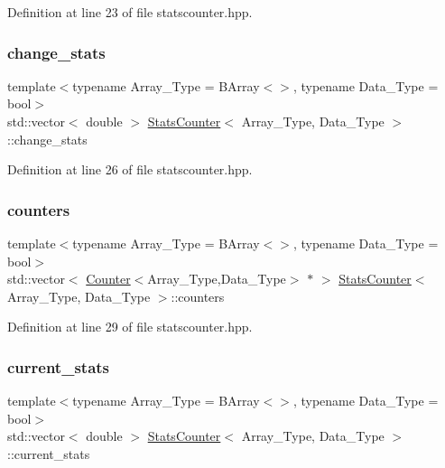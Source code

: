 Definition at line 23 of file statscounter.\+hpp.

\mbox{\label{class_stats_counter_a42c926799d8cb0abc6f5a1cfbc073f69}} 
\subsubsection{\texorpdfstring{change\+\_\+stats}{change\_stats}}
{\footnotesize\ttfamily template$<$typename Array\+\_\+\+Type  = B\+Array$<$$>$, typename Data\+\_\+\+Type  = bool$>$ \\
std\+::vector$<$ double $>$ \hyperlink{class_stats_counter}{Stats\+Counter}$<$ Array\+\_\+\+Type, Data\+\_\+\+Type $>$\+::change\+\_\+stats}



Definition at line 26 of file statscounter.\+hpp.

\mbox{\label{class_stats_counter_ab81464f54ee44deedf3fb1f16f9b87c5}} 
\subsubsection{\texorpdfstring{counters}{counters}}
{\footnotesize\ttfamily template$<$typename Array\+\_\+\+Type  = B\+Array$<$$>$, typename Data\+\_\+\+Type  = bool$>$ \\
std\+::vector$<$ \hyperlink{class_counter}{Counter}$<$Array\+\_\+\+Type,Data\+\_\+\+Type$>$ $\ast$ $>$ \hyperlink{class_stats_counter}{Stats\+Counter}$<$ Array\+\_\+\+Type, Data\+\_\+\+Type $>$\+::counters}



Definition at line 29 of file statscounter.\+hpp.

\mbox{\label{class_stats_counter_af98192f893280a2681a59f4b73051ca3}} 
\subsubsection{\texorpdfstring{current\+\_\+stats}{current\_stats}}
{\footnotesize\ttfamily template$<$typename Array\+\_\+\+Type  = B\+Array$<$$>$, typename Data\+\_\+\+Type  = bool$>$ \\
std\+::vector$<$ double $>$ \hyperlink{class_stats_counter}{Stats\+Counter}$<$ Array\+\_\+\+Type, Data\+\_\+\+Type $>$\+::current\+\_\+stats}



